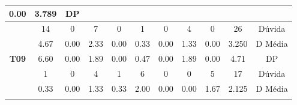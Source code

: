 \begin{table}[htbp]
\begin{tabular}{|ccccccccccc|}
		\multicolumn{1}{c|}{\cellcolor[HTML]{D9D9D9}0.00} &
		\multicolumn{1}{c|}{\cellcolor[HTML]{D9D9D9}3.789} &
		DP \\ \hline
		\multicolumn{1}{|c|}{\cellcolor[HTML]{F2F2F2}} &
		\multicolumn{1}{c|}{14} &
		\multicolumn{1}{c|}{0} &
		\multicolumn{1}{c|}{7} &
		\multicolumn{1}{c|}{0} &
		\multicolumn{1}{c|}{1} &
		\multicolumn{1}{c|}{0} &
		\multicolumn{1}{c|}{4} &
		\multicolumn{1}{c|}{0} &
		\multicolumn{1}{c|}{26} &
		Dúvida \\ \cline{2-11} 
		\rowcolor[HTML]{D9D9D9} 
		\multicolumn{1}{|c|}{\cellcolor[HTML]{F2F2F2}} &
		\multicolumn{1}{c|}{\cellcolor[HTML]{D9D9D9}4.67} &
		\multicolumn{1}{c|}{\cellcolor[HTML]{D9D9D9}0.00} &
		\multicolumn{1}{c|}{\cellcolor[HTML]{D9D9D9}2.33} &
		\multicolumn{1}{c|}{\cellcolor[HTML]{D9D9D9}0.00} &
		\multicolumn{1}{c|}{\cellcolor[HTML]{D9D9D9}0.33} &
		\multicolumn{1}{c|}{\cellcolor[HTML]{D9D9D9}0.00} &
		\multicolumn{1}{c|}{\cellcolor[HTML]{D9D9D9}1.33} &
		\multicolumn{1}{c|}{\cellcolor[HTML]{D9D9D9}0.00} &
		\multicolumn{1}{c|}{\cellcolor[HTML]{D9D9D9}3.250} &
		D Média \\ \cline{2-11} 
		\multicolumn{1}{|c|}{\multirow{-3}{*}{\cellcolor[HTML]{F2F2F2}\textbf{T09}}} &
		\multicolumn{1}{c|}{6.60} &
		\multicolumn{1}{c|}{0.00} &
		\multicolumn{1}{c|}{1.89} &
		\multicolumn{1}{c|}{0.00} &
		\multicolumn{1}{c|}{0.47} &
		\multicolumn{1}{c|}{0.00} &
		\multicolumn{1}{c|}{1.89} &
		\multicolumn{1}{c|}{0.00} &
		\multicolumn{1}{c|}{4.71} &
		DP \\ \hline
		\rowcolor[HTML]{D9D9D9} 
		\multicolumn{1}{|c|}{\cellcolor[HTML]{F2F2F2}} &
		\multicolumn{1}{c|}{\cellcolor[HTML]{D9D9D9}1} &
		\multicolumn{1}{c|}{\cellcolor[HTML]{D9D9D9}0} &
		\multicolumn{1}{c|}{\cellcolor[HTML]{D9D9D9}4} &
		\multicolumn{1}{c|}{\cellcolor[HTML]{D9D9D9}1} &
		\multicolumn{1}{c|}{\cellcolor[HTML]{D9D9D9}6} &
		\multicolumn{1}{c|}{\cellcolor[HTML]{D9D9D9}0} &
		\multicolumn{1}{c|}{\cellcolor[HTML]{D9D9D9}0} &
		\multicolumn{1}{c|}{\cellcolor[HTML]{D9D9D9}5} &
		\multicolumn{1}{c|}{\cellcolor[HTML]{D9D9D9}17} &
		Dúvida \\ \cline{2-11} 
		\multicolumn{1}{|c|}{\cellcolor[HTML]{F2F2F2}} &
		\multicolumn{1}{c|}{0.33} &
		\multicolumn{1}{c|}{0.00} &
		\multicolumn{1}{c|}{1.33} &
		\multicolumn{1}{c|}{0.33} &
		\multicolumn{1}{c|}{2.00} &
		\multicolumn{1}{c|}{0.00} &
		\multicolumn{1}{c|}{0.00} &
		\multicolumn{1}{c|}{1.67} &
		\multicolumn{1}{c|}{2.125} &
		D Média \\ \cline{2-11} 
		\rowcolor[HTML]{D9D9D9} 
		\multicolumn{1}{|c|}{\multirow{-3}{*}{\cellcolor[HTML]{F2F2F2}\textbf{T10}}} &

\end{tabular}
\end{table}
